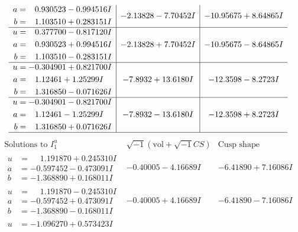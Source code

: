 \documentclass[1p]{elsarticle_modified}
\theoremstyle{definition}
\newcommand{\I}{\sqrt{-1}}
\begin{document}
$$\begin{array}{c|c|c}
\begin{aligned}
a &= \phantom{-}0.930523 - 0.994516 I \\
b &= \phantom{-}1.103510 + 0.283151 I\end{aligned}
 & -2.13828 - 7.70452 I & -10.95675 + 8.64865 I \\ \hline\begin{aligned}
u &= \phantom{-}0.377700 - 0.817120 I \\
a &= \phantom{-}0.930523 + 0.994516 I \\
b &= \phantom{-}1.103510 - 0.283151 I\end{aligned}
 & -2.13828 + 7.70452 I & -10.95675 - 8.64865 I \\ \hline\begin{aligned}
u &= -0.304901 + 0.821700 I \\
a &= \phantom{-}1.12461 + 1.25299 I \\
b &= \phantom{-}1.316850 - 0.071626 I\end{aligned}
 & -7.8932 + 13.6180 I & -12.3598 - 8.2723 I \\ \hline\begin{aligned}
u &= -0.304901 - 0.821700 I \\
a &= \phantom{-}1.12461 - 1.25299 I \\
b &= \phantom{-}1.316850 + 0.071626 I\end{aligned}
 & -7.8932 - 13.6180 I & -12.3598 + 8.2723 I\\
 \hline 
 \end{array}$$\newpage$$\begin{array}{c|c|c}  
\text{Solutions to }I^u_{1}& \I (\text{vol} + \sqrt{-1}CS) & \text{Cusp shape}\\
 \hline 
\begin{aligned}
u &= \phantom{-}1.191870 + 0.245310 I \\
a &= -0.597452 - 0.473091 I \\
b &= -1.368890 + 0.168011 I\end{aligned}
 & -0.40005 - 4.16689 I & -6.41890 + 7.16086 I \\ \hline\begin{aligned}
u &= \phantom{-}1.191870 - 0.245310 I \\
a &= -0.597452 + 0.473091 I \\
b &= -1.368890 - 0.168011 I\end{aligned}
 & -0.40005 + 4.16689 I & -6.41890 - 7.16086 I \\ \hline\begin{aligned}
u &= -1.096270 + 0.573423 I \\

\end{aligned}
\end{array}$$
\end{document}
